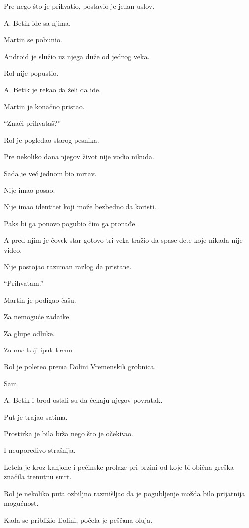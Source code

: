 Pre nego što je prihvatio, postavio je jedan uslov.

A. Betik ide sa njima.

Martin se pobunio.

Android je služio uz njega duže od jednog veka.

Rol nije popustio.

A. Betik je rekao da želi da ide.

\bigskip

Martin je konačno pristao.

``Znači prihvataš?''

Rol je pogledao starog pesnika.

Pre nekoliko dana njegov život nije vodio nikuda.

Sada je već jednom bio mrtav.

Nije imao posao.

Nije imao identitet koji može bezbedno da koristi.

Paks bi ga ponovo pogubio čim ga pronađe.

A pred njim je čovek star gotovo tri veka tražio da spase dete koje nikada nije video.

\bigskip

Nije postojao razuman razlog da pristane.

``Prihvatam.''

\bigskip

Martin je podigao čašu.

Za nemoguće zadatke.

Za glupe odluke.

Za one koji ipak krenu.

\bigskip

Rol je poleteo prema Dolini Vremenskih grobnica.

Sam.

A. Betik i brod ostali su da čekaju njegov povratak.

\bigskip

Put je trajao satima.

Prostirka je bila brža nego što je očekivao.

I neuporedivo strašnija.

Letela je kroz kanjone i pećinske prolaze pri brzini od koje bi obična greška značila trenutnu smrt.

Rol je nekoliko puta ozbiljno razmišljao da je pogubljenje možda bilo prijatnija mogućnost.

\bigskip

Kada se približio Dolini, počela je peščana oluja.

